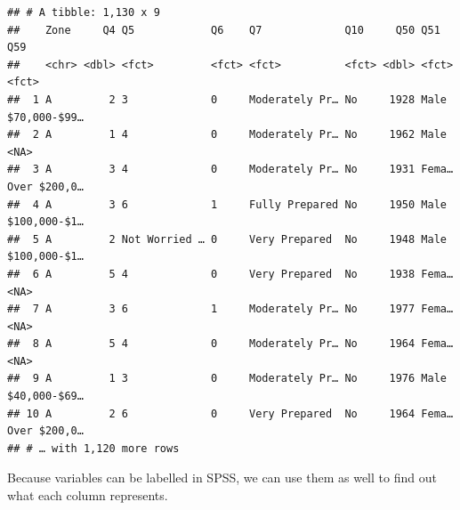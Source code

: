 \documentclass[
]{book}
\newenvironment{Shaded}{\begin{snugshade}}{\end{snugshade}}
\newcommand{\CommentTok}[1]{\textcolor[rgb]{0.56,0.35,0.01}{\textit{#1}}}
\newcommand{\ControlFlowTok}[1]{\textcolor[rgb]{0.13,0.29,0.53}{\textbf{#1}}}
\newcommand{\KeywordTok}[1]{\textcolor[rgb]{0.13,0.29,0.53}{\textbf{#1}}}
\newcommand{\NormalTok}[1]{#1}
\newcommand{\OperatorTok}[1]{\textcolor[rgb]{0.81,0.36,0.00}{\textbf{#1}}}
\begin{document}
\begin{verbatim}
## # A tibble: 1,130 x 9
##    Zone     Q4 Q5            Q6    Q7             Q10     Q50 Q51   Q59         
##    <chr> <dbl> <fct>         <fct> <fct>          <fct> <dbl> <fct> <fct>       
##  1 A         2 3             0     Moderately Pr… No     1928 Male  $70,000-$99…
##  2 A         1 4             0     Moderately Pr… No     1962 Male  <NA>        
##  3 A         3 4             0     Moderately Pr… No     1931 Fema… Over $200,0…
##  4 A         3 6             1     Fully Prepared No     1950 Male  $100,000-$1…
##  5 A         2 Not Worried … 0     Very Prepared  No     1948 Male  $100,000-$1…
##  6 A         5 4             0     Very Prepared  No     1938 Fema… <NA>        
##  7 A         3 6             1     Moderately Pr… No     1977 Fema… <NA>        
##  8 A         5 4             0     Moderately Pr… No     1964 Fema… <NA>        
##  9 A         1 3             0     Moderately Pr… No     1976 Male  $40,000-$69…
## 10 A         2 6             0     Very Prepared  No     1964 Fema… Over $200,0…
## # … with 1,120 more rows
\end{verbatim}

Because variables can be labelled in SPSS, we can use them as well to find out what each column represents.

\begin{Shaded}
\end{Shaded}
\end{document}
